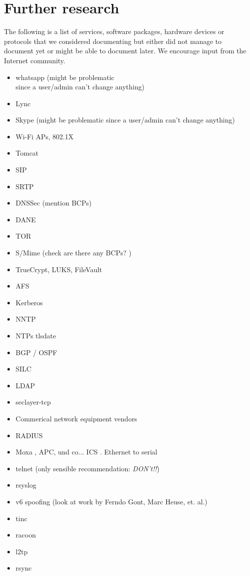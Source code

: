 \chapter{Further research}
\label{cha:further-research}
The following is a list of services, software packages, hardware devices or protocols that we considered documenting but either did not manage to document yet or might be able to document later. We encourage input from the Internet community. 

\begin{multicols}{3}
\begin{itemize}
\item whatsapp (might be problematic\\ since a user/admin can't change anything)
\item Lync
\item Skype (might be problematic since a user/admin can't change anything)
\item Wi-Fi APs, 802.1X
\item Tomcat
\item SIP 
\item SRTP 
\item DNSSec (mention BCPs) 
\item DANE
\item TOR 
\item S/Mime (check are there any BCPs? )
\item TrueCrypt, LUKS, FileVault
\item AFS 
\item Kerberos 
\item NNTP 
\item NTPs tlsdate 
\item BGP / OSPF 
\item SILC
\item LDAP
\item seclayer-tcp
\item Commerical network equipment vendors
\item RADIUS 
\item Moxa , APC, und co... ICS . Ethernet to serial 
\item telnet (only sensible recommendation: \emph{DON't!!})
\item rsyslog 
\item v6 spoofing (look at work by Ferndo Gont, Marc Heuse, et. al.)
\item tinc
\item racoon
\item l2tp
\item rsync 

\end{itemize}
\end{multicols}
